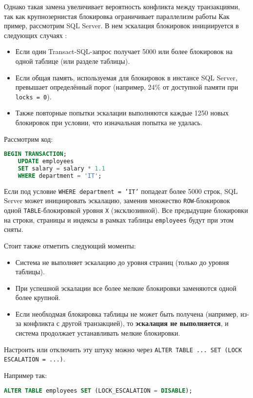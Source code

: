 Однако такая замена увеличивает вероятность конфликта между транзакциями, так как крупнозернистая блокировка ограничивает параллелизм работы \autocite{MicrosoftLearnSQLserverTransLock}
Как пример, рассмотрим SQL Server. В нем эскалация блокировок инициируется в следующих случаях \autocite{MicrosoftLearnSQLserverTransLock}:
\begin{itemize}
    \item Если один Transact-SQL-запрос получает 5000 или более блокировок на одной таблице (или разделе таблицы).
    \item Если общая память, используемая для блокировок в инстансе SQL Server, превышает определённый порог (например, 24\% от доступной памяти при \texttt{locks = 0}).
    \item Также повторные попытки эскалации выполняются каждые 1250 новых блокировок при условии, что изначальная попытка не удалась.
\end{itemize}

Рассмотрим код:
\begin{lstlisting}[language=SQL]
    BEGIN TRANSACTION;
    UPDATE employees
    SET salary = salary * 1.1
    WHERE department = 'IT';
\end{lstlisting}
Если под условие \texttt{WHERE department = 'IT'} попадеат более 5000 строк, SQL Server может инициировать эскалацию, заменив множество \texttt{ROW}-блокировок одной \texttt{TABLE}-блокировкой уровня \texttt{X} (эксклюзивной). Все предыдущие блокировки на строки, страницы и индексы в рамках таблицы \texttt{employees} будут при этом сняты.

Стоит также отметить следующий моменты:
\begin{itemize}
    \item Система не выполняет эскалацию до уровня страниц (только до уровня таблицы).
    \item При успешной эскалации все более мелкие блокировки заменяются одной более крупной.
    \item Если необходмая блокировка таблицы не может быть получена (например, из-за конфликта с другой транзакцией), то \textbf{эскалация не выполняется}, и система продолжает устанавливать мелкие блокировки.
\end{itemize}

Настроить или отключить эту штуку можно через \texttt{ALTER TABLE ... SET (LOCK ESCALATION = ...)}.

Например так:
\begin{lstlisting}[language=SQL]
    ALTER TABLE employees SET (LOCK_ESCALATION = DISABLE);
\end{lstlisting}

